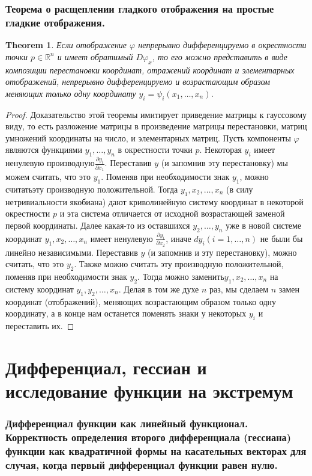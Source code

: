 \documentclass[a4paper,12pt]{article} %
\newtheorem{theorem}{Theorem}
\theoremstyle{definition}
\begin{document}
\section{Теорема о расщеплении гладкого отображения на простые гладкие отображения.}
\begin{theorem}
	Если отображение $\varphi$  непрерывно дифференцируемо в окрестности точки $p\in \mathbb{R}^n$ и имеет обратимый $D\varphi_x$, то его можно представить в виде композиции перестановки координат, отражений координат и элементарных отображений, непрерывно дифференцируемо и возрастающим образом меняющих только одну координату $y_i=\psi_i(x_1,\dots,x_n)$.
\end{theorem}
\begin{proof}
	Доказательство этой теоремы имитирует приведение матрицы к гауссовому виду, то есть разложение матрицы в произведение матрицы перестановки, матриц умножений координаты на число, и элементарных матриц. Пусть компоненты $\varphi$ являются функциями $y_1,\dots,y_n$ в окрестности точки $p$. Некоторая $y_i$ имеет ненулевую производную$\frac{\partial y_i}{\partial x_1}$. Переставив $y$ (и запомнив эту перестановку) мы можем считать, что это $y_1$. Поменяв при необходимости знак $y_1$, можно считатьэту производную положительной. Тогда $y_1,x_2,\dots,x_n$ (в силу нетривиальности якобиана) дают криволинейную систему координат в некоторой окрестности $p$ и эта система отличается от исходной возрастающей заменой первой координаты. Далее какая-то из оставшихся $y_2,\dots,y_n$ уже в новой системе координат $y_1,x_2,\dots,x_n$ имеет ненулевую $\frac{\partial y_i}{\partial x_2}$, иначе $dy_i(i=  1,\dots,n)$ не были бы линейно независимыми. Переставив $y$ (и запомнив и эту перестановку), можно считать, что это $y_2$. Также можно считать эту производную положительной, поменяв при необходимости знак $y_2$. Тогда можно заменить$y_1,x_2,\dots,x_n$ на систему координат $y_1,y_2,\dots,x_n$. Делая в том же духе $n$ раз, мы сделаем $n$ замен координат (отображений), меняющих возрастающим образом только одну координату, а в конце нам останется поменять знаки у некоторых $y_i$ и переставить их.
\end{proof}
\part{Дифференциал, гессиан и исследование функции на экстремум}
\section{Дифференциал функции как линейный функционал. Корректность определения второго дифференциала (гессиана) функции как квадратичной формы на касательных векторах для случая, когда первый дифференциал функции равен нулю.}
\end{document}
